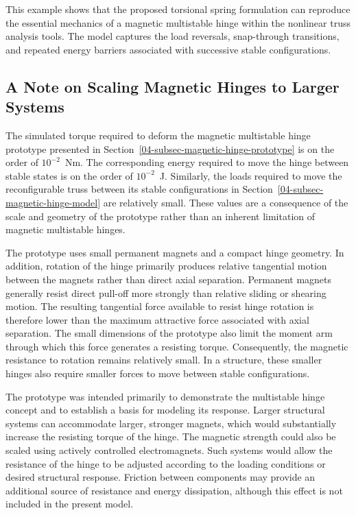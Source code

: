 This example shows that the proposed torsional spring formulation can reproduce the essential mechanics of a magnetic multistable hinge within the nonlinear truss analysis tools. The model captures the load reversals, snap-through transitions, and repeated energy barriers associated with successive stable configurations.

\subsection{A Note on Scaling Magnetic Hinges to Larger Systems}\label{04-subsec-magnetic-hinge-scalability}
The simulated torque required to deform the magnetic multistable hinge prototype presented in Section~\ref{04-subsec-magnetic-hinge-prototype} is on the order of \(10^{-2}\)~Nm. The corresponding energy required to move the hinge between stable states is on the order of \(10^{-2}\)~J. Similarly, the loads required to move the reconfigurable truss between its stable configurations in Section~\ref{04-subsec-magnetic-hinge-model} are relatively small. These values are a consequence of the scale and geometry of the prototype rather than an inherent limitation of magnetic multistable hinges.

The prototype uses small permanent magnets and a compact hinge geometry. In addition, rotation of the hinge primarily produces relative tangential motion between the magnets rather than direct axial separation. Permanent magnets generally resist direct pull-off more strongly than relative sliding or shearing motion. The resulting tangential force available to resist hinge rotation is therefore lower than the maximum attractive force associated with axial separation. The small dimensions of the prototype also limit the moment arm through which this force generates a resisting torque. Consequently, the magnetic resistance to rotation remains relatively small. In a structure, these smaller hinges also require smaller forces to move between stable configurations. 

The prototype was intended primarily to demonstrate the multistable hinge concept and to establish a basis for modeling its response. Larger structural systems can accommodate larger, stronger magnets, which would substantially increase the resisting torque of the hinge. The magnetic strength could also be scaled using actively controlled electromagnets. Such systems would allow the resistance of the hinge to be adjusted according to the loading conditions or desired structural response. Friction between components may provide an additional source of resistance and energy dissipation, although this effect is not included in the present model.

